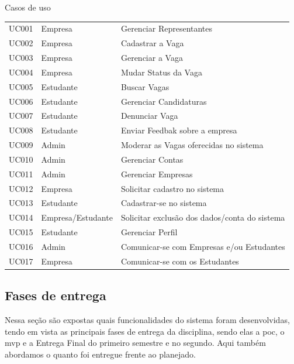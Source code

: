 \begin{quadro}[H]
	\centering
	\ABNTEXfontereduzida
	\caption{Casos de uso}
	\label{user-cases}
	\begin{tabular}{|l|p{4 cm}|p{9 cm}|}
		\hline 
		\thead{Código} & \thead[l]{Ator} & \thead[l]{Descrição} \\
		\hline
		UC001 & Empresa & Gerenciar Representantes\\
		\hline
		UC002 & Empresa & Cadastrar a Vaga \\
		\hline
		UC003 & Empresa & Gerenciar a Vaga \\
		\hline
		UC004 & Empresa & Mudar Status da Vaga \\
		\hline
		UC005 & Estudante & Buscar Vagas \\
		\hline
		UC006 & Estudante & Gerenciar Candidaturas \\
		\hline
		UC007 & Estudante & Denunciar Vaga \\
		\hline
		UC008 & Estudante & Enviar Feedbak sobre a empresa \\
		\hline
		UC009 & Admin & Moderar as Vagas oferecidas no sistema \\
		\hline
		UC010 & Admin & Gerenciar Contas \\
		\hline
		UC011 & Admin & Gerenciar Empresas \\
		\hline
		UC012 & Empresa & Solicitar cadastro no sistema \\
		\hline
		UC013 & Estudante & Cadastrar-se no sistema \\
		\hline
		UC014 & Empresa/Estudante & Solicitar exclusão dos dados/conta do sistema \\
		\hline
		UC015 & Estudante & Gerenciar Perfil \\
		\hline
		UC016 & Admin & Comunicar-se com Empresas e/ou Estudantes \\
		\hline
		UC017 & Empresa & Comunicar-se com os Estudantes \\
		\hline
	\end{tabular}
\end{quadro}

\subsection{Fases de entrega}

Nessa seção são expostas quais funcionalidades do sistema foram desenvolvidas, tendo em vista as principais fases de entrega da disciplina, sendo elas a \ac{poc}, o \ac{mvp} e a Entrega Final do primeiro semestre e no segundo. Aqui também abordamos o quanto foi entregue frente ao planejado.

